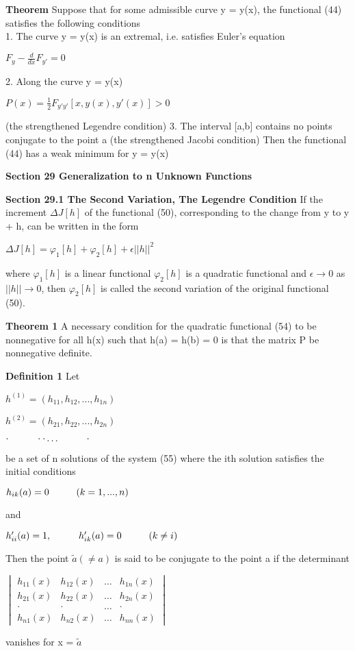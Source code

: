 \documentclass{article}
\newcommand\tab[1][1cm]{\hspace*{#1}}
\begin{document}
\textbf {Theorem} Suppose that for some admissible curve y = y(x), the functional (44) satisfies the following conditions \\
1. The curve y = y(x) is an extremal, i.e. satisfies Euler's equation
\begin{center}
$F_y - \frac{d}{dx} F_{y'} = 0$
\end{center}
2. Along the curve y = y(x)
\begin{center}
 $P(x) = \frac{1}{2} F_{y'y'} [x, y(x), y'(x)] > 0$
\end{center}
(the strengthened Legendre condition)
3. The interval [a,b] contains no points conjugate to the point a (the strengthened Jacobi condition)
Then the functional (44) has a weak minimum for y = y(x)

\textbf {Section 29 Generalization to n Unknown Functions}

\textbf {Section 29.1 The Second Variation, The Legendre Condition} If the increment $\Delta J[h]$ of the functional (50), corresponding to the change from y to y + h, can be written in the form
\begin{center}
$\Delta J[h] = \varphi_1[h] + \varphi_2[h] + \epsilon||h||^2$
\end{center}
where $\varphi_1[h]$ is a linear functional $\varphi_2[h]$ is a quadratic functional and $\epsilon \to 0$ as $||h|| \to 0$, then $\varphi_2[h]$ is called the second variation of the original functional (50).

\textbf {Theorem 1} A necessary condition for the quadratic functional (54) to be nonnegative for all h(x) such that h(a) = h(b) = 0 is that the matrix P be nonnegative definite.

\textbf {Definition 1} Let
\begin{center}
$h^{(1)} = (h_{11}, h_{12}, ..., h_{1n})$
\end{center}
\begin{center}
$h^{(2)} = (h_{21}, h_{22}, ..., h_{2n})$
\end{center}
\begin{center}
$\cdot \tab \cdot \cdot \dots \tab \cdot$
\end{center}
be a set of n solutions of the system (55) where the ith solution satisfies the initial conditions
\begin{center}
$h_{ik}(a) = 0 \tab (k=1,...,n)$
\end{center}
and 
\begin{center}
$h'_{ii}(a) = 1, \tab h'_{ik}(a) = 0 \tab (k \neq i)$
\end{center}
Then the point $\tilde{a} (\neq a)$ is said to be conjugate to the point a if the determinant 
\begin{center}
$\begin{vmatrix}
h_{11}(x) &  h_{12}(x) & \dots & h_{1n}(x) \\
h_{21}(x) & h_{22}(x) & \dots & h_{2n}(x) \\
\cdot &\cdot & \dots & \cdot \\
h_{n1}(x) & h_{n2}(x) & \dots & h_{nn}(x)
\end{vmatrix}
$
\end{center}
vanishes for x = $\tilde{a}$
\end{document}
